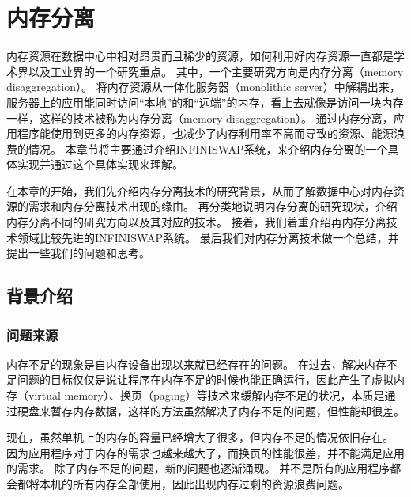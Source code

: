 
\chapter{内存分离} %

\label{Chapter2} %

%

内存资源在数据中心中相对昂贵而且稀少的资源，如何利用好内存资源一直都是学术界以及工业界的一个研究重点。
其中，一个主要研究方向是内存分离（memory disaggregation）。
将内存资源从一体化服务器（monolithic server）中解耦出来，服务器上的应用能同时访问“本地”的和“远端”的内存，看上去就像是访问一块内存一样，这样的技术被称为内存分离（memory disaggregation）。
通过内存分离，应用程序能使用到更多的内存资源，也减少了内存利用率不高而导致的资源、能源浪费的情况。
本章节将主要通过介绍INFINISWAP系统，来介绍内存分离的一个具体实现并通过这个具体实现来理解。

在本章的开始，我们先介绍内存分离技术的研究背景，从而了解数据中心对内存资源的需求和内存分离技术出现的缘由。
再分类地说明内存分离的研究现状，介绍内存分离不同的研究方向以及其对应的技术。
接着，我们着重介绍再内存分离技术领域比较先进的INFINISWAP系统\cite{gu2017efficient}。
最后我们对内存分离技术做一个总结，并提出一些我们的问题和思考。


\section{背景介绍}

\subsection{问题来源}
内存不足的现象是自内存设备出现以来就已经存在的问题。
在过去，解决内存不足问题的目标仅仅是说让程序在内存不足的时候也能正确运行，因此产生了虚拟内存（virtual memory）、换页（paging）等技术来缓解内存不足的状况，本质是通过硬盘来暂存内存数据，这样的方法虽然解决了内存不足的问题，但性能却很差。

现在，虽然单机上的内存的容量已经增大了很多，但内存不足的情况依旧存在。
因为应用程序对于内存的需求也越来越大了，而换页的性能很差，并不能满足应用的需求。
除了内存不足的问题，新的问题也逐渐涌现。
并不是所有的应用程序都会都将本机的所有内存全部使用，因此出现内存过剩的资源浪费问题。


